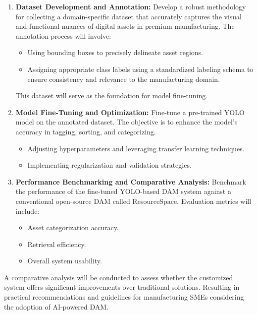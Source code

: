\documentclass[a4paper,10pt,twocolumn]{article}
\numberwithin{figure}{section}
\numberwithin{table}{section}
\begin{document}
\begin{enumerate} 
    
    \item \textbf{Dataset Development and Annotation:}
    Develop a robust methodology for collecting a domain-specific dataset that 
    accurately captures the visual and functional nuances of digital assets 
    in premium manufacturing. The annotation process will involve: 
    \begin{itemize} 
        \item Using bounding boxes to precisely delineate asset regions. 
        \item Assigning appropriate class labels using a standardized labeling schema 
        to ensure consistency and relevance to the manufacturing domain. 
    \end{itemize}
    
    This dataset will serve as the foundation for model fine-tuning.

    \item \textbf{Model Fine-Tuning and Optimization:}  
    Fine-tune a pre-trained YOLO model on the annotated dataset. 
    The objective is to enhance the model’s 
    accuracy in tagging, sorting, and categorizing.
    \begin{itemize}
        \item Adjusting hyperparameters and leveraging transfer learning techniques.
        \item Implementing regularization and validation strategies.
    \end{itemize}

    \item \textbf{Performance Benchmarking and Comparative Analysis:}  
    Benchmark the performance of the fine-tuned YOLO-based DAM system against a 
    conventional open-source DAM called ResourceSpace. Evaluation metrics will include:
    \begin{itemize}
        \item Asset categorization accuracy.
        \item Retrieval efficiency.
        \item Overall system usability.
    \end{itemize}
\end{enumerate}

A comparative analysis will be conducted to assess whether the customized 
system offers significant improvements over traditional solutions. 
Resulting in practical recommendations 
and guidelines for manufacturing SMEs 
considering the adoption of AI-powered DAM.
\end{document}

